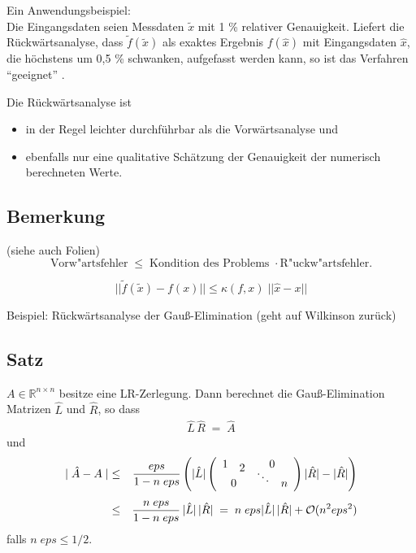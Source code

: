 \documentclass[ngerman,fontsize=11pt, paper=a4, parskip=half, titlepage=true, toc=bib]{scrbook}
\newcommand{\R}{\mathds{R}}
\begin{document}
  Ein Anwendungsbeispiel:\\
  Die Eingangsdaten seien Messdaten $\tilde{x}$  mit 1 \% relativer Genauigkeit. 
  Liefert die Rückwärtsanalyse, dass $\tilde{f} (\tilde{x})$ als exaktes Ergebnis 
  $f(\hat x)$ mit Eingangsdaten $\hat x$, 
  die höchstens um 0,5 \% schwanken, aufgefasst werden kann,
  so ist das Verfahren \enquote{geeignet} . 
  
  Die Rückwärtsanalyse ist
   \begin{itemize}
   	\item in der Regel leichter durchführbar als die
   	Vorwärtsanalyse  und 
   	\item ebenfalls nur eine qualitative Schätzung der
   	Genauigkeit der numerisch berechneten Werte.
   \end{itemize}
  
  \subsection{Bemerkung}
  (siehe auch Folien) \\
   $$ \mbox{Vorw"artsfehler} \; \leq \; \mbox{Kondition des
   	Problems } \cdot \mbox{R"uckw"artsfehler} .$$
   
   $$ ||\tilde f (\tilde x)  - f(x)|| \leq \kappa (f,x) \; || \hat x -x|| $$
  
  Beispiel: Rückwärtsanalyse der Gauß-Elimination
  (geht auf Wilkinson zurück)
  
  
  \subsection{Satz}
  $A \in \R^{n\times n}$ besitze eine LR-Zerlegung. Dann berechnet die
  Gauß-Elimination Matrizen $\hat{L}$ und $\hat{R}$,
  so dass
	\begin{gather*}\hat{L}\,\hat{R}\; = \;\hat{A}\end{gather*}
  und
  \begin{align*}
  	\mid \hat{ A} -  A \mid & \leq & \frac{eps}{1 -n \;eps}
  	\left( | \hat{ L} | \left( \begin{array}{cccc}
  		1 && \multicolumn{2}{c}{0}\\[-2ex] & 2
  		&&\\[-2ex]
  		&&\ddots & \\[-2ex]  \multicolumn{2}{c}{0} && n
  	\end{array} \right)
  	| \hat{ R} | - |\hat{ R}| \right)
  	\\[1ex]
  	& \leq & \frac{n \; eps}{1- n \;eps}\, | \hat{ L} | \,
  	|\hat{ R}| \; 
  	= \; n \; eps  | \hat{ L} | \,  |\hat{ R}| +
  	\mathcal{O}( n^2 eps^2)
  \end{align*}
  falls $n\;eps \leq 1/2$.
  
\end{document}
